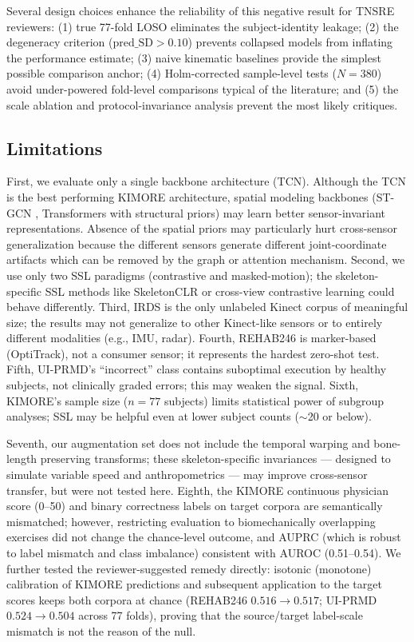 \documentclass[10pt,journal]{IEEEtran}
\begin{document}
Several design choices enhance the reliability of this negative result for TNSRE reviewers: (1) true 77-fold LOSO eliminates the subject-identity leakage; (2) the degeneracy criterion ($\text{pred\_SD} > 0.10$) prevents collapsed models from inflating the performance estimate; (3) naive kinematic baselines provide the simplest possible comparison anchor; (4) Holm-corrected sample-level tests ($N = 380$) avoid under-powered fold-level comparisons typical of the literature; and (5) the scale ablation and protocol-invariance analysis prevent the most likely critiques.

\subsection{Limitations}
\label{sec:limitations}

First, we evaluate only a single backbone architecture (TCN). Although the TCN is the best performing KIMORE architecture, spatial modeling backbones (ST-GCN \cite{yan2018stgcn}, Transformers with structural priors) may learn better sensor-invariant representations. Absence of the spatial priors may particularly hurt cross-sensor generalization because the different sensors generate different joint-coordinate artifacts which can be removed by the graph or attention mechanism. Second, we use only two SSL paradigms (contrastive and masked-motion); the skeleton-specific SSL methods like SkeletonCLR \cite{thoker2021skeletonclr} or cross-view contrastive learning could behave differently. Third, IRDS is the only unlabeled Kinect corpus of meaningful size; the results may not generalize to other Kinect-like sensors or to entirely different modalities (e.g., IMU, radar). Fourth, REHAB246 is marker-based (OptiTrack), not a consumer sensor; it represents the hardest zero-shot test. Fifth, UI-PRMD's ``incorrect'' class contains suboptimal execution by healthy subjects, not clinically graded errors; this may weaken the signal. Sixth, KIMORE's sample size ($n = 77$ subjects) limits statistical power of subgroup analyses; SSL may be helpful even at lower subject counts ($\sim$20 or below).

Seventh, our augmentation set does not include the temporal warping and bone-length preserving transforms; these skeleton-specific invariances \cite{thoker2021skeletonclr} --- designed to simulate variable speed and anthropometrics --- may improve cross-sensor transfer, but were not tested here. Eighth, the KIMORE continuous physician score (0--50) and binary correctness labels on target corpora are semantically mismatched; however, restricting evaluation to biomechanically overlapping exercises did not change the chance-level outcome, and AUPRC (which is robust to label mismatch and class imbalance) consistent with AUROC (0.51--0.54). We further tested the reviewer-suggested remedy directly: isotonic (monotone) calibration of KIMORE predictions and subsequent application to the target scores keeps both corpora at chance (REHAB246 $0.516 \to 0.517$; UI-PRMD $0.524 \to 0.504$ across 77 folds), proving that the source/target label-scale mismatch is not the reason of the null.
\end{document}
